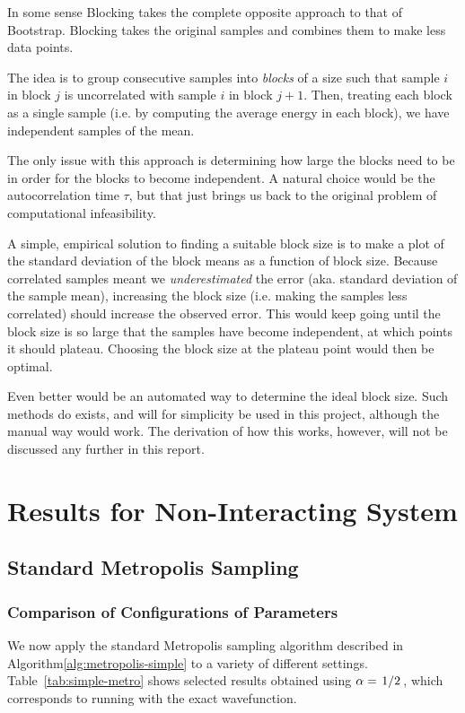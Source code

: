 \documentclass[twocolumn]{article}
\begin{document}
In some sense Blocking takes the complete opposite approach to that of
Bootstrap. Blocking takes the original samples and combines them to make less
data points.

The idea is to group consecutive samples into \textit{blocks} of a size such
that sample $i$ in block $j$ is uncorrelated with sample $i$ in block $j+1$.
Then, treating each block as a single sample (i.e. by computing the average
energy in each block), we have independent samples of the mean. 

The only issue with this approach is determining how large the blocks need to be
in order for the blocks to become independent. A natural choice would be the
autocorrelation time $\tau$, but that just brings us back to the original
problem of computational infeasibility.

A simple, empirical solution to finding a suitable block size is to make a plot
of the standard deviation of the block means as a function of block
size. Because correlated samples meant we \textit{underestimated} the error (aka.
standard deviation of the sample mean), increasing the block size (i.e. making the
samples less correlated) should increase the observed error. This would keep
going until the block size is so large that the samples have become independent,
at which points it should plateau. Choosing the block size at the plateau point
would then be optimal.

Even better would be an automated way to determine the ideal block size. Such
methods do exists, and will for simplicity be used in this project, although the
manual way would work. The derivation of how this
works, however, will not be discussed any further in this report.


\section{Results for Non-Interacting System}

\subsection{Standard Metropolis Sampling}

\subsubsection{Comparison of Configurations of Parameters}

We now apply the standard Metropolis sampling algorithm described in 
Algorithm\ref{alg:metropolis-simple} to a variety of different settings.
Table~\ref{tab:simple-metro} shows selected results obtained using
$\alpha=\flatfrac{1}{2}$, which corresponds to running with the exact
wavefunction. 
\end{document}
